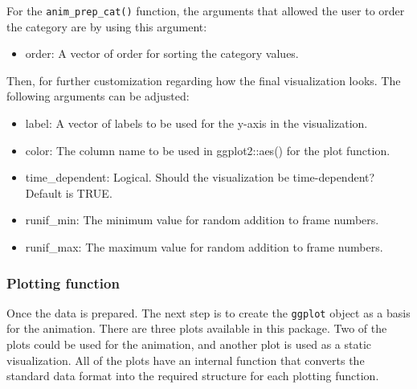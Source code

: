 For the \texttt{anim\_prep\_cat()} function, the arguments that allowed the user to order the category are by using this argument:

\begin{itemize}
\tightlist
\item
  order: A vector of order for sorting the category values.
\end{itemize}

Then, for further customization regarding how the final visualization looks. The following arguments can be adjusted:

\begin{itemize}
\tightlist
\item
  label: A vector of labels to be used for the y-axis in the visualization.
\item
  color: The column name to be used in ggplot2::aes() for the plot function.
\item
  time\_dependent: Logical. Should the visualization be time-dependent? Default is TRUE.
\item
  runif\_min: The minimum value for random addition to frame numbers.
\item
  runif\_max: The maximum value for random addition to frame numbers.
\end{itemize}

\hypertarget{plotting-function}{%
\subsubsection{Plotting function}\label{plotting-function}}

Once the data is prepared. The next step is to create the \texttt{ggplot} object as a basis for the animation. There are three plots available in this package. Two of the plots could be used for the animation, and another plot is used as a static visualization. All of the plots have an internal function that converts the standard data format into the required structure for each plotting function.

